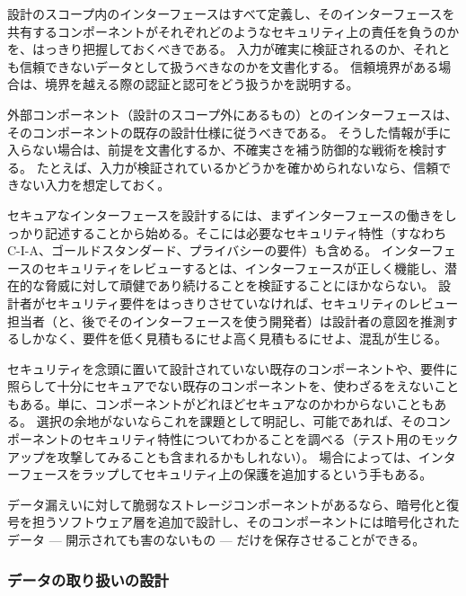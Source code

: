 \documentclass[uplatex]{jsarticle}
\def\label#1{}%
\begin{document}
設計のスコープ内のインターフェースはすべて定義し、そのインターフェースを共有するコンポーネントがそれぞれどのようなセキュリティ上の責任を負うのかを、はっきり把握しておくべきである。
入力が確実に検証されるのか、それとも信頼できないデータとして扱うべきなのかを文書化する。
信頼境界がある場合は、境界を越える際の認証と認可をどう扱うかを説明する。

外部コンポーネント（設計のスコープ外にあるもの）とのインターフェースは、そのコンポーネントの既存の設計仕様に従うべきである。
そうした情報が手に入らない場合は、前提を文書化するか、不確実さを補う防御的な戦術を検討する。
たとえば、入力が検証されているかどうかを確かめられないなら、信頼できない入力を想定しておく。

セキュアなインターフェースを設計するには、まずインターフェースの働きをしっかり記述することから始める。そこには必要なセキュリティ特性（すなわち C-I-A、ゴールドスタンダード、プライバシーの要件）も含める。
インターフェースのセキュリティをレビューするとは、インターフェースが正しく機能し、潜在的な脅威に対して頑健であり続けることを検証することにほかならない。
設計者がセキュリティ要件をはっきりさせていなければ、セキュリティのレビュー担当者（と、後でそのインターフェースを使う開発者）は設計者の意図を推測するしかなく、要件を低く見積もるにせよ高く見積もるにせよ、混乱が生じる。

セキュリティを念頭に置いて設計されていない既存のコンポーネントや、要件に照らして十分にセキュアでない既存のコンポーネントを、使わざるをえないこともある。単に、コンポーネントがどれほどセキュアなのかわからないこともある。
選択の余地がないならこれを課題として明記し、可能であれば、そのコンポーネントのセキュリティ特性についてわかることを調べる（テスト用のモックアップを攻撃してみることも含まれるかもしれない）。
場合によっては、インターフェースをラップしてセキュリティ上の保護を追加するという手もある。

\begin{exa}[暗号化層によるストレージコンポーネントのラップ]\label{exa:ch6-wrap-storage}
データ漏えいに対して脆弱なストレージコンポーネントがあるなら、暗号化と復号を担うソフトウェア層を追加で設計し、そのコンポーネントには暗号化されたデータ --- 開示されても害のないもの --- だけを保存させることができる。
\end{exa}

\subsubsection{データの取り扱いの設計}\label{subsec:ch6-designing-data-handling}
\end{document}
